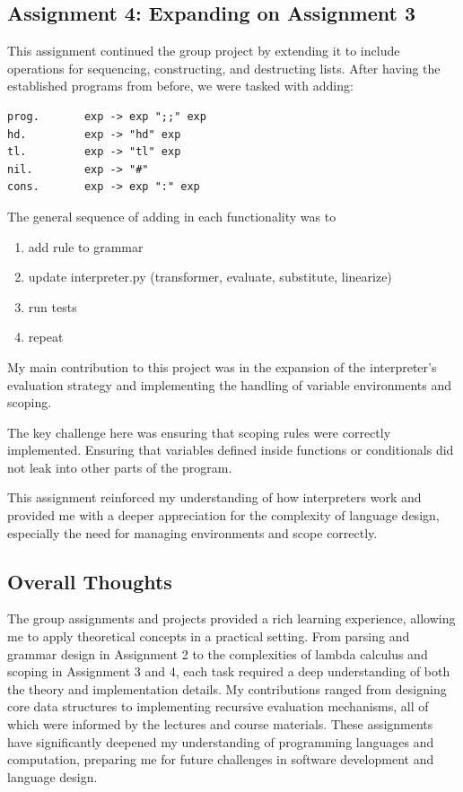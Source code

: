 \documentclass{article}
\theoremstyle{theorem}
\theoremstyle{definition}
\theoremstyle{remark}
\begin{document}
\subsection*{Assignment 4: Expanding on Assignment 3}
This assignment continued the group project by extending it to include operations
for sequencing, constructing, and destructing lists. After having the established programs from before, 
we were tasked with adding: 
\begin{verbatim}
prog.       exp -> exp ";;" exp
hd.         exp -> "hd" exp
tl.         exp -> "tl" exp 
nil.        exp -> "#"
cons.       exp -> exp ":" exp
\end{verbatim}
The general sequence of adding in each functionality was to 
\begin{enumerate}
  \item add rule to grammar
  \item update interpreter.py (transformer, evaluate, substitute, linearize)
  \item run tests
  \item repeat
\end{enumerate}
My main contribution to this project was in the expansion of the interpreter’s 
evaluation strategy and implementing the handling of variable environments and scoping.

The key challenge here was ensuring that scoping rules were correctly implemented. Ensuring
that variables defined inside functions or conditionals did not leak into other parts of the program.

This assignment reinforced my understanding of how interpreters work and provided me with a deeper 
appreciation for the complexity of language design, especially the need for managing environments and scope correctly.
\subsection*{Overall Thoughts}
The group assignments and projects provided a rich learning experience, allowing me to apply theoretical 
concepts in a practical setting. From parsing and grammar design in Assignment 2 to the complexities of 
lambda calculus and scoping in Assignment 3 and 4, each task required a deep understanding of both the theory and 
implementation details. My contributions ranged from designing core data structures to implementing recursive evaluation 
mechanisms, all of which were informed by the lectures and course materials. These assignments have significantly deepened 
my understanding of programming languages and computation, preparing me for future challenges in software development and 
language design.
\end{document}
